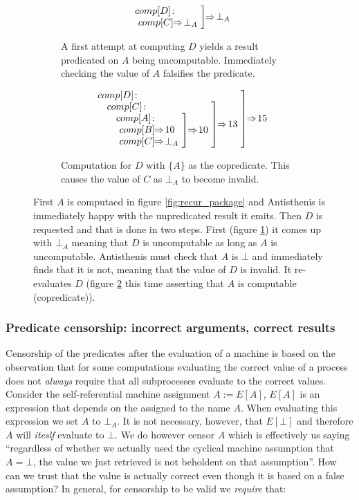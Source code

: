 \begin{figure}[H]
  \begin{subfigure}{0.4\linewidth}
    \[
      \comp{\bot_A}{D}{comp[C] \ev \bot_A}
    \]
    \caption{\label{fig:compdnaive}A first attempt at computing \(D\)
      yields a result predicated on \(A\) being
      uncomputable. Immediately checking the value of \(A\) falsifies
      the predicate.}
  \end{subfigure}
  \begin{subfigure}{0.4\linewidth}
    \[
    \comp{15}{D}{
      \comp{13}{C}{
        \comp{10}{A}{
          comp[B] \ev 10 \\
          \ comp[C] \ev \bot_A}}}
  \]
  \caption{\label{fig:compdsmart}Computation for \(D\) with \(\{A\}\)
    as the copredicate. This causes the value of \(C\) as \(\bot_A\)
    to become invalid.}
  \end{subfigure}
  \caption{\label{fig:correct} First \(A\) is computaed in figure
    \ref{fig:recur_package} and Antisthenis is immediately happy with
    the unpredicated result it emits. Then \(D\) is requested and that
    is done in two steps. First (figure \ref{fig:compdnaive}) it comes
    up with \(\bot_A\) meaning that \(D\) is uncomputable as long as
    \(A\) is uncomputable. Antisthenis must check that \(A\) is
    \(\bot\) and immediately finds that it is not, meaning that the
    value of \(D\) is invalid. It re-evaluates \(D\) (figure
    \ref{fig:compdsmart} this time asserting that \(A\) is computable
    (copredicate)).}
\end{figure}

\subsubsection{Predicate censorship: incorrect arguments, correct
  results}

Censorship of the predicates after the evaluation of a machine is
based on the observation that for some computations evaluating the
correct value of a process does not \emph{always} require that all
subprocesses evaluate to the correct values. Consider the
self-referential machine assignment \(A := E[A]\), \(E[A]\) is an
expression that depends on the assigned to the name \(A\). When
evaluating this expression we set \(A\) to \(\bot_A\). It is not
necessary, however, that \(E[\bot]\) and therefore \(A\) will
\emph{iteslf} evaluate to \(\bot\). We do however censor \(A\) which
is effectively us saying ``regardless of whether we actually used the
cyclical machine assumption that \(A = \bot\), the value we just
retrieved is not beholdent on that assumption''. How can we trust that
the value is actually correct even though it is based on a false
assumption? In general, for censorship to be valid we \emph{require}
that:

